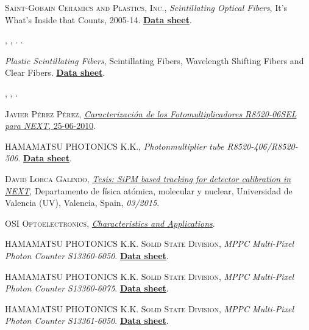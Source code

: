 \begin{thebibliography}{100}
 \textsc{Saint-Gobain Ceramics and Plastics, Inc.},
\textit{Scintillating Optical Fibers}, It's What's Inside that Counts, 2005-14. \href{https://www.crystals.saint-gobain.com/products/scintillating-fiber}{\textbf{Data sheet}}. 

 \textsc{},
\textit{}, . \href{}{\textbf{}}. 

\textit{Plastic Scintillating Fibers}, Scintillating Fibers, Wavelength Shifting Fibers and Clear Fibers. \href{https://www.kuraray.com/products/psf}{\textbf{Data sheet}}. 

 \textsc{},
\textit{}, \href{}{\textbf{}}. 

 \textsc{Javier Pérez Pérez},
 \href{https://next.ific.uv.es/cgi-bin/DocDB/public/ShowDocument?docid=48}{\textit{Caracterización de los Fotomultiplicadores R8520-06SEL para NEXT}, 25-06-2010}.

 \textsc{HAMAMATSU PHOTONICS K.K.},
\textit{Photonmultiplier tube R8520-406/R8520-506}. \href{https://www.hamamatsu.com/eu/en/product/type/R8520-406/index.html}{\textbf{Data sheet}}.

 \textsc{David Lorca Galindo},
\href{https://dialnet.unirioja.es/servlet/tesis?codigo=101465}{\textit{Tesis: SiPM based tracking for detector calibration in NEXT}}, Departamento de física atómica, molecular y nuclear, Universidad de Valencia (UV), Valencia, Spain, \textit{03/2015}.

 \textsc{OSI Optoelectronics}, 
\href{https://osioptoelectronics.com/standard-products/default.aspx?gclid=EAIaIQobChMIkYrLif_37QIVDNTtCh3NuwpkEAAYASAAEgKMJ_D_BwE}{\textit{Characteristics and Applications}}.

 \textsc{HAMAMATSU PHOTONICS K.K. Solid State Division},
\textit{MPPC Multi-Pixel Photon Counter S13360-6050}. \href{https://www.hamamatsu.com/eu/en/product/type/S13360-6050CS/index.html}{\textbf{Data sheet}}.

 \textsc{HAMAMATSU PHOTONICS K.K. Solid State Division},
\textit{MPPC Multi-Pixel Photon Counter S13360-6075}. \href{https://www.hamamatsu.com/eu/en/product/type/S13360-6075CS/index.html}{\textbf{Data sheet}}.

 \textsc{HAMAMATSU PHOTONICS K.K. Solid State Division},
\textit{MPPC Multi-Pixel Photon Counter S13361-6050}. \href{https://www.hamamatsu.com/us/en/product/type/S13361-6050AE-04/index.html}{\textbf{Data sheet}}.


\end{thebibliography}
